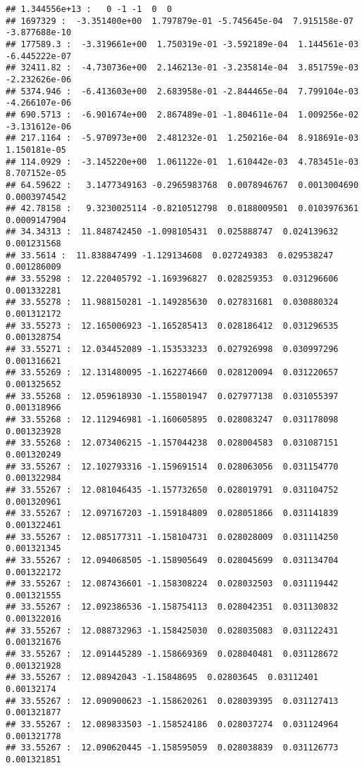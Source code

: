 \documentclass[]{book}
\theoremstyle{definition}
\theoremstyle{definition}
\theoremstyle{definition}
\theoremstyle{remark}
\begin{document}
\begin{verbatim}
## 1.344556e+13 :   0 -1 -1  0  0
## 1697329 :  -3.351400e+00  1.797879e-01 -5.745645e-04  7.915158e-07 -3.877688e-10
## 177589.3 :  -3.319661e+00  1.750319e-01 -3.592189e-04  1.144561e-03 -6.445222e-07
## 32411.82 :  -4.730736e+00  2.146213e-01 -3.235814e-04  3.851759e-03 -2.232626e-06
## 5374.946 :  -6.413603e+00  2.683958e-01 -2.844465e-04  7.799104e-03 -4.266107e-06
## 690.5713 :  -6.901674e+00  2.867489e-01 -1.804611e-04  1.009256e-02 -3.131612e-06
## 217.1164 :  -5.970973e+00  2.481232e-01  1.250216e-04  8.918691e-03  1.150181e-05
## 114.0929 :  -3.145220e+00  1.061122e-01  1.610442e-03  4.783451e-03  8.707152e-05
## 64.59622 :   3.1477349163 -0.2965983768  0.0078946767  0.0013004690  0.0003974542
## 42.78158 :   9.3230025114 -0.8210512798  0.0188009501  0.0103976361  0.0009147904
## 34.34313 :  11.848742450 -1.098105431  0.025888747  0.024139632  0.001231568
## 33.5614 :  11.838847499 -1.129134608  0.027249383  0.029538247  0.001286009
## 33.55298 :  12.220405792 -1.169396827  0.028259353  0.031296606  0.001332281
## 33.55278 :  11.988150281 -1.149285630  0.027831681  0.030880324  0.001312172
## 33.55273 :  12.165006923 -1.165285413  0.028186412  0.031296535  0.001328754
## 33.55271 :  12.034452089 -1.153533233  0.027926998  0.030997296  0.001316621
## 33.55269 :  12.131480095 -1.162274660  0.028120094  0.031220657  0.001325652
## 33.55268 :  12.059618930 -1.155801947  0.027977138  0.031055397  0.001318966
## 33.55268 :  12.112946981 -1.160605895  0.028083247  0.031178098  0.001323928
## 33.55268 :  12.073406215 -1.157044238  0.028004583  0.031087151  0.001320249
## 33.55267 :  12.102793316 -1.159691514  0.028063056  0.031154770  0.001322984
## 33.55267 :  12.081046435 -1.157732650  0.028019791  0.031104752  0.001320961
## 33.55267 :  12.097167203 -1.159184809  0.028051866  0.031141839  0.001322461
## 33.55267 :  12.085177311 -1.158104731  0.028028009  0.031114250  0.001321345
## 33.55267 :  12.094068505 -1.158905649  0.028045699  0.031134704  0.001322172
## 33.55267 :  12.087436601 -1.158308224  0.028032503  0.031119442  0.001321555
## 33.55267 :  12.092386536 -1.158754113  0.028042351  0.031130832  0.001322016
## 33.55267 :  12.088732963 -1.158425030  0.028035083  0.031122431  0.001321676
## 33.55267 :  12.091445289 -1.158669369  0.028040481  0.031128672  0.001321928
## 33.55267 :  12.08942043 -1.15848695  0.02803645  0.03112401  0.00132174
## 33.55267 :  12.090900623 -1.158620261  0.028039395  0.031127413  0.001321877
## 33.55267 :  12.089833503 -1.158524186  0.028037274  0.031124964  0.001321778
## 33.55267 :  12.090620445 -1.158595059  0.028038839  0.031126773  0.001321851
\end{verbatim}
\end{document}

